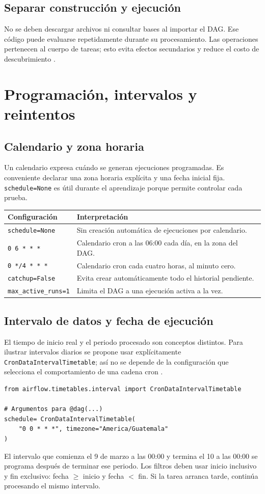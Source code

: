\documentclass[12pt]{article}
\begin{document}
\subsection{Separar construcción y ejecución}
No se deben descargar archivos ni consultar bases al importar el DAG. Ese código puede evaluarse repetidamente durante su procesamiento. Las operaciones pertenecen al cuerpo de tareas; esto evita efectos secundarios y reduce el costo de descubrimiento \cite{airflow_best}.

\section{Programación, intervalos y reintentos}
\subsection{Calendario y zona horaria}
Un calendario expresa cuándo se generan ejecuciones programadas. Es conveniente declarar una zona horaria explícita y una fecha inicial fija. \texttt{schedule=None} es útil durante el aprendizaje porque permite controlar cada prueba.
\begin{longtable}{@{}p{}p{}@{}}
\toprule
\textbf{Configuración} & \textbf{Interpretación} \\
\midrule
\texttt{schedule=None} & Sin creación automática de ejecuciones por calendario. \\
\texttt{0 6 * * *} & Calendario cron a las 06:00 cada día, en la zona del DAG. \\
\texttt{0 */4 * * *} & Calendario cron cada cuatro horas, al minuto cero. \\
\texttt{catchup=False} & Evita crear automáticamente todo el historial pendiente. \\
\texttt{max\_active\_runs=1} & Limita el DAG a una ejecución activa a la vez. \\
\bottomrule
\end{longtable}

\subsection{Intervalo de datos y fecha de ejecución}
El tiempo de inicio real y el periodo procesado son conceptos distintos. Para ilustrar intervalos diarios se propone usar explícitamente \texttt{CronDataIntervalTimetable}; así no se depende de la configuración que selecciona el comportamiento de una cadena cron \cite{airflow_timetable,airflow_runs}.
\begin{lstlisting}[style=python]
from airflow.timetables.interval import CronDataIntervalTimetable

# Argumentos para @dag(...)
schedule= CronDataIntervalTimetable(
    "0 0 * * *", timezone="America/Guatemala"
)
\end{lstlisting}
El intervalo que comienza el 9 de marzo a las 00:00 y termina el 10 a las 00:00 se programa después de terminar ese periodo. Los filtros deben usar inicio inclusivo y fin exclusivo: fecha $\geq$ inicio y fecha $<$ fin. Si la tarea arranca tarde, continúa procesando el mismo intervalo.
\end{document}
